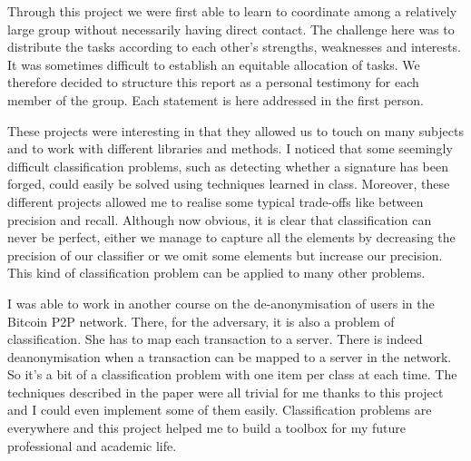 \documentclass{homework}
\begin{document}
\maketitle



Through this project we were first able to learn to coordinate among a relatively large group without necessarily having direct contact. The challenge here was to distribute the tasks according to each other's strengths, weaknesses and interests. It was sometimes difficult to establish an equitable allocation of tasks. We therefore decided to structure this report as a personal testimony for each member of the group. Each statement is here addressed in the first person.

These projects were interesting in that they allowed us to touch on many subjects and to work with different libraries and methods. I noticed that some seemingly difficult classification problems, such as detecting whether a signature has been forged, could easily be solved using techniques learned in class. Moreover, these different projects allowed me to realise some typical trade-offs like between precision and recall. Although now obvious, it is clear that classification can never be perfect, either we manage to capture all the elements by decreasing the precision of our classifier or we omit some elements but increase our precision. This kind of classification problem can be applied to many other problems.

I was able to work in another course on the de-anonymisation of users in the Bitcoin P2P network. There, for the adversary, it is also a problem of classification. She has to map each transaction to a server. There is indeed deanonymisation when a transaction can be mapped to a server in the network. So it's a bit of a classification problem with one item per class at each time. The techniques described in the paper were all trivial for me thanks to this project and I could even implement some of them easily. Classification problems are everywhere and this project helped me to build a toolbox for my future professional and academic life.

\end{document}

